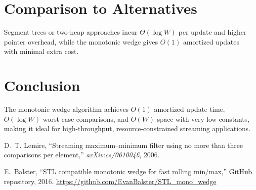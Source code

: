 \documentclass[12pt,letterpaper]{article}
\begin{document}
\section{Comparison to Alternatives}
Segment trees or two-heap approaches incur \(\Theta(\log W)\) per update and higher pointer overhead, while the monotonic wedge gives \(O(1)\) amortized updates with minimal extra cost.

\section{Conclusion}
The monotonic wedge algorithm achieves \(O(1)\) amortized update time, \(O(\log W)\) worst-case comparisons, and \(O(W)\) space with very low constants, making it ideal for high-throughput, resource-constrained streaming applications.

\begin{thebibliography}{9}
D.~T. Lemire, “Streaming maximum–minimum filter using no more than three comparisons per element,” \emph{arXiv:cs/0610046}, 2006.

E.~Balster, “STL compatible monotonic wedge for fast rolling min/max,” GitHub repository, 2016. \url{https://github.com/EvanBalster/STL_mono_wedge}
\end{thebibliography}
\end{document}
